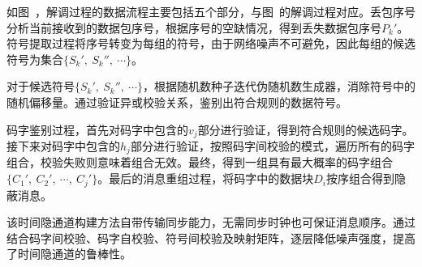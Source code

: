 如图\ ，解调过程的数据流程主要包括五个部分，与图\ 的解调过程对应。丢包序号分析当前接收到的数据包序号，根据序号的空缺情况，得到丢失数据包序号$P_{k}'$。符号提取过程将序号转变为每组的符号，由于网络噪声不可避免，因此每组的候选符号为集合$\{S_{k}',\ S_{k}'',\ \cdots \}$。

对于候选符号$\{S_{k}',\ S_{k}'',\ \cdots \}$，根据随机数种子迭代伪随机数生成器，消除符号中的随机偏移量。通过验证异或校验关系，鉴别出符合规则的数据符号。

码字鉴别过程，首先对码字中包含的$v_{j}$部分进行验证，得到符合规则的候选码字。接下来对码字中包含的$h_{j}$部分进行验证，按照码字间校验的模式，遍历所有的码字组合，校验失败则意味着组合无效。最终，得到一组具有最大概率的码字组合$\{C_{1}',\ C_{2}',\ \cdots,\ C_{j}'\}$。最后的消息重组过程，将码字中的数据块$D_{i}$按序组合得到隐蔽消息。

该时间隐通道构建方法自带传输同步能力，无需同步时钟也可保证消息顺序。通过结合码字间校验、码字自校验、符号间校验及映射矩阵，逐层降低噪声强度，提高了时间隐通道的鲁棒性。